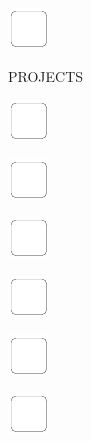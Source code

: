\documentclass[11pt,titlepage]{article}
\begin{document}
\noindent
\includegraphics[]{checkbox-6mm.pdf}

\pagebreak

\small
\hfill PROJECTS

\vspace{6mm}

\noindent
\includegraphics[]{checkbox-6mm.pdf}

\vspace{12mm}

\noindent
\includegraphics[]{checkbox-6mm.pdf}

\vspace{12mm}

\noindent
\includegraphics[]{checkbox-6mm.pdf}

\vspace{12mm}

\noindent
\includegraphics[]{checkbox-6mm.pdf}

\vspace{12mm}

\noindent
\includegraphics[]{checkbox-6mm.pdf}

\vspace{12mm}

\noindent
\includegraphics[]{checkbox-6mm.pdf}

\vspace{12mm}
\end{document}
